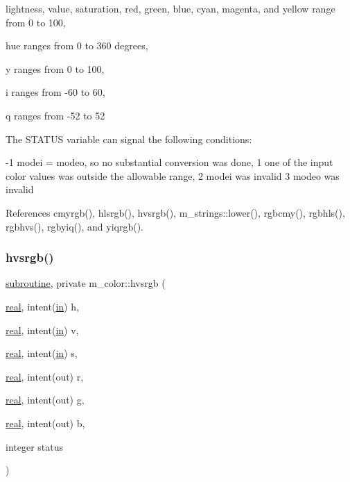 \begin{DoxyDescription}
\begin{DoxyItemize}
\item lightness, value, saturation, red, green, blue, cyan, magenta, and yellow range from 0 to 100, 
\item hue ranges from 0 to 360 degrees, 
\item y ranges from 0 to 100, 
\item i ranges from -\/60 to 60, 
\item q ranges from -\/52 to 52 
\end{DoxyItemize}



The S\+T\+A\+T\+US variable can signal the following conditions\+: 




\begin{DoxyPre}
    -1   modei = modeo, so no substantial conversion was done,
     1   one of the input color values was outside the allowable range,
     2   modei was invalid
     3   modeo was invalid
 \end{DoxyPre}
 


\end{DoxyDescription}

References cmyrgb(), hlsrgb(), hvsrgb(), m\+\_\+strings\+::lower(), rgbcmy(), rgbhls(), rgbhvs(), rgbyiq(), and yiqrgb().

\mbox{\label{namespacem__color_a334ec90d94bbfb9a4c08c5f9efdb8c47}} 
\subsubsection{\texorpdfstring{hvsrgb()}{hvsrgb()}}
{\footnotesize\ttfamily \hyperlink{M__stopwatch_83_8txt_acfbcff50169d691ff02d4a123ed70482}{subroutine}, private m\+\_\+color\+::hvsrgb (\begin{DoxyParamCaption}\item[{\hyperlink{read__watch_83_8txt_abdb62bde002f38ef75f810d3a905a823}{real}, intent(\hyperlink{M__journal_83_8txt_afce72651d1eed785a2132bee863b2f38}{in})}]{h,  }\item[{\hyperlink{read__watch_83_8txt_abdb62bde002f38ef75f810d3a905a823}{real}, intent(\hyperlink{M__journal_83_8txt_afce72651d1eed785a2132bee863b2f38}{in})}]{v,  }\item[{\hyperlink{read__watch_83_8txt_abdb62bde002f38ef75f810d3a905a823}{real}, intent(\hyperlink{M__journal_83_8txt_afce72651d1eed785a2132bee863b2f38}{in})}]{s,  }\item[{\hyperlink{read__watch_83_8txt_abdb62bde002f38ef75f810d3a905a823}{real}, intent(out)}]{r,  }\item[{\hyperlink{read__watch_83_8txt_abdb62bde002f38ef75f810d3a905a823}{real}, intent(out)}]{g,  }\item[{\hyperlink{read__watch_83_8txt_abdb62bde002f38ef75f810d3a905a823}{real}, intent(out)}]{b,  }\item[{integer}]{status }\end{DoxyParamCaption})\hspace{0.3cm}{\ttfamily [private]}}


